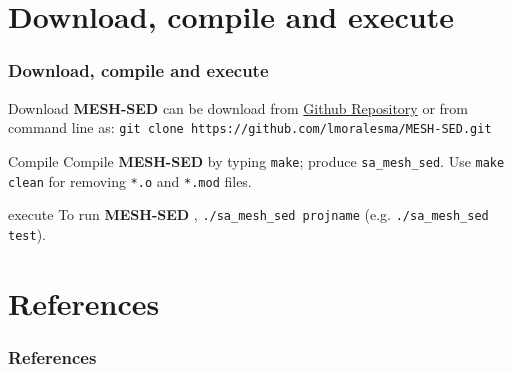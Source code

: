 \documentclass{beamer}
\newcommand{\ms}{\textbf{MESH-SED} }
\begin{document}
\section{Download, compile and execute}
\begin{frame}\frametitle{Download, compile and execute}
\begin{block}{Download}
\ms can be download from \href{https://github.com/lmoralesma/MESH-SED}{Github Repository} or from command line as: \texttt{git clone https://github.com/lmoralesma/MESH-SED.git}
\end{block}

\begin{block}{Compile}
Compile \ms by typing \texttt{make}; produce \texttt{sa\_mesh\_sed}. Use  \texttt{make clean} for removing \texttt{*.o} and \texttt{*.mod} files.
\end{block}

\begin{block}{execute}
To run \ms, \texttt{./sa\_mesh\_sed projname} (e.g. \texttt{./sa\_mesh\_sed test}).
\end{block}
\end{frame}


\section{References}
\begin{frame}[allowframebreaks] 
\frametitle{References}
 
 
\end{frame}
\end{document}
